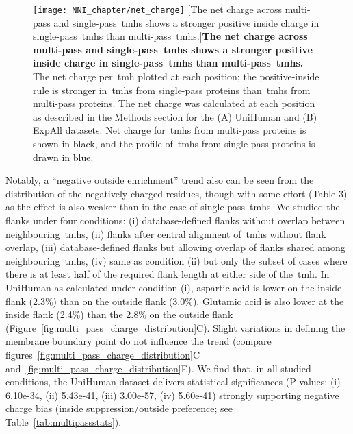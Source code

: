\begin{figure}[!ht]
\centering
\texttt{[image: NNI\_chapter/net\_charge]}
[The net charge across multi-pass and single-pass~\gls{tmh}s shows a stronger positive inside charge in single-pass~\gls{tmh}s than multi-pass~\gls{tmh}s.]{\textbf{The net charge across multi-pass and single-pass~\gls{tmh}s shows a stronger positive inside charge in single-pass~\gls{tmh}s than multi-pass~\gls{tmh}s.}
The net charge per~\gls{tmh} plotted at each position; the positive-inside rule is stronger in~\gls{tmh}s from single-pass proteins than~\gls{tmh}s from multi-pass proteins.
The net charge was calculated at each position as described in the Methods section for the (A) UniHuman and (B) ExpAll datasets.
Net charge for~\gls{tmh}s from multi-pass proteins is shown in black, and the profile of~\gls{tmh}s from single-pass proteins is drawn in blue.}

\label{fig:net_charge}
\end{figure}

Notably, a ``negative outside enrichment'' trend also can be seen from the distribution of the negatively charged residues, though with some effort (Table 3) as the effect is also weaker than in the case of single-pass~\gls{tmh}s.
We studied the flanks under four conditions: (i) database-defined flanks without overlap between neighbouring~\gls{tmh}s, (ii) flanks after central alignment of~\gls{tmh}s without flank overlap, (iii) database-defined flanks but allowing overlap of flanks shared among neighbouring~\gls{tmh}s, (iv) same as condition (ii) but only the subset of cases where there is at least half of the required flank length at either side of the~\gls{tmh}.
In UniHuman as calculated under condition (i), aspartic acid is lower on the inside flank (2.3\%) than on the outside flank (3.0\%).
Glutamic acid is also lower at the inside flank (2.4\%) than the 2.8\% on the outside flank (Figure~\ref{fig:multi_pass_charge_distribution}C).
Slight variations in defining the membrane boundary point do not influence the trend (compare figures~\ref{fig:multi_pass_charge_distribution}C and~\ref{fig:multi_pass_charge_distribution}E).
We find that, in all studied conditions, the UniHuman dataset delivers statistical significances (P-values: (i) 6.10e-34, (ii) 5.43e-41, (iii) 3.00e-57, (iv) 5.60e-41) strongly supporting negative charge bias (inside suppression/outside preference; see Table~\ref{tab:multipassstats}).


